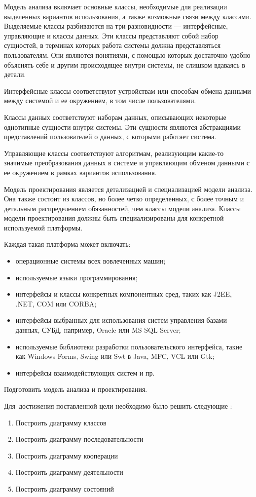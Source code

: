 
{\actuality} 
Модель анализа включает основные классы, необходимые для реализации выделенных вариантов использования, а также возможные связи между классами. Выделяемые классы разбиваются на три разновидности — интерфейсные, управляющие и классы данных. Эти классы представляют собой набор сущностей, в терминах которых работа системы должна представляться пользователям. Они являются понятиями, с помощью которых достаточно удобно объяснять себе и другим происходящее внутри системы, не слишком вдаваясь в детали.

Интерфейсные классы соответствуют устройствам или способам обмена данными между системой и ее окружением, в том числе пользователями.

Классы данных соответствуют наборам данных, описывающих некоторые однотипные сущности внутри системы. Эти сущности являются абстракциями представлений пользователей о данных, с которыми работает система.

Управляющие классы соответствуют алгоритмам, реализующим какие-то значимые преобразования данных в системе и управляющим обменом данными с ее окружением в рамках вариантов использования.

Модель проектирования является детализацией и специализацией модели анализа. Она также состоит из классов, но более четко определенных, с более точным и детальным распределением обязанностей, чем классы модели анализа. Классы модели проектирования должны быть специализированы для конкретной используемой платформы. 

Каждая такая платформа может включать:
\begin{itemize}
	\item операционные системы всех вовлеченных машин;
	\item используемые языки программирования;
	\item интерфейсы и классы конкретных компонентных сред, таких как J2EE, .NET, COM или CORBA;
	\item интерфейсы выбранных для использования систем управления базами данных, СУБД, например, Oracle или MS SQL Server;
	\item используемые библиотеки разработки пользовательского интерфейса, такие как Windows Forms, Swing или Swt в Java, MFC, VCL или Gtk;
	\item интерфейсы взаимодействующих систем и пр.
\end{itemize}

{\aim} Подготовить модель анализа и проектирования.

Для~достижения поставленной цели необходимо было решить следующие {\tasks}:
\begin{enumerate}
  \item Построить диаграмму классов
  \item Построить диаграмму последовательности
  \item Построить диаграмму кооперации
  \item Построить диаграмму деятельности
  \item Построить диаграмму состояний
\end{enumerate}
    

